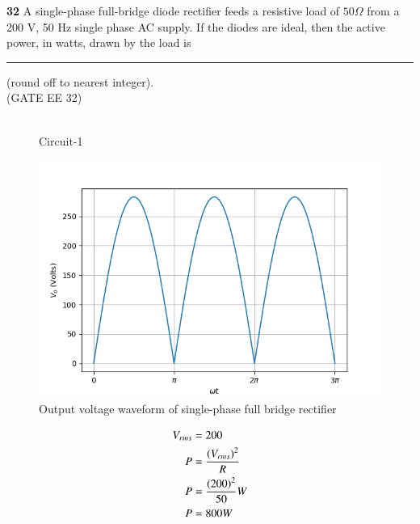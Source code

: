 \documentclass[journal,12pt,twocolumn]{IEEEtran}
\begin{document}


\vspace{3cm}

\title{}
\author{EE23BTECH11047 - Deepakreddy P
}
\maketitle
\newpage
\bigskip

\noindent \textbf{32} \quad A single-phase full-bridge diode rectifier feeds a resistive load of $50 \Omega$ from a 200 V,
50 Hz single phase AC supply. If the diodes are ideal, then the active power, in watts,
drawn by the load is \rule{1cm}{0.5mm} (round off to nearest integer).  \\
\hfill (GATE EE 32)\\
\solution\\

\begin{figure}[ht]
  \centering
  \begin{adjustbox}{width=0.8\columnwidth}
      
  \end{adjustbox}
  \caption{Circuit-1}
\end{figure}

\begin{figure}[ht]
   \centering
   \includegraphics[width=1.2\columnwidth]{figs/gt1.png}
   \caption{Output voltage waveform of single-phase full
bridge rectifier}
\end{figure}


\begin{center}
    \begin{table}[ht]
        
    \end{table}
\end{center}

\begin{align}
    V_{rms} &= 200\\
    P &= \frac{\left(V_{rms}\right)^2}{R}\\
    P &= \frac{\left(200\right)^2}{50}W\\
    P &= 800W
\end{align}
\end{document}
